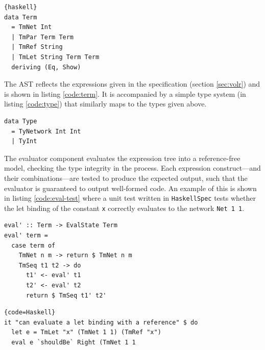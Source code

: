 \lstset{caption=The Volr AST in Haskell., mathescape=false,showstringspaces=false}
\begin{lstlisting}{haskell}
data Term
  = TmNet Int 
  | TmPar Term Term                                                                                                                                                                                             
  | TmRef String                                                                                                                                                                                                
  | TmLet String Term Term                                                                                                                                                                                      
  deriving (Eq, Show)  
\end{lstlisting} \label{code:term}

The AST reflects the expressions given in the 
specification (section \ref{sec:volr}) and is
shown in listing \ref{code:term}.
It is accompanied by a simple type system (in listing \ref{code:type})
that similarly maps to the types given above.

\lstset{caption=Volr type system in Haskell.}
\begin{lstlisting}
data Type 
  = TyNetwork Int Int
  | TyInt
\end{lstlisting} \label{code:type}

The evaluator component evaluates the expression tree into
a reference-free model, checking the type integrity in the
process.
Each expression construct---and their combinations---are
tested to produce the expected output, such that the evaluator
is guaranteed to output well-formed code.
An example of this is shown in listing \ref{code:eval-test}
where a unit test  written in \texttt{HaskellSpec} 
tests whether the let binding of the constant \texttt{x} correctly
evaluates to the network \texttt{Net 1 1}.

\lstset{caption=Part of the evaluation code in Haskell.}
\begin{lstlisting}
eval' :: Term -> EvalState Term
eval' term =
  case term of
    TmNet n m -> return $ TmNet n m
    TmSeq t1 t2 -> do
      t1' <- eval' t1 
      t2' <- eval' t2
      return $ TmSeq t1' t2'
\end{lstlisting} \label{code:evaluator}

\lstset{caption=A unit test for the correct evaluation of a let binding.}
\begin{lstlisting}{code=Haskell}
it "can evaluate a let binding with a reference" $ do
  let e = TmLet "x" (TmNet 1 1) (TmRef "x")
  eval e `shouldBe` Right (TmNet 1 1
\end{lstlisting} \label{code:eval-test}

